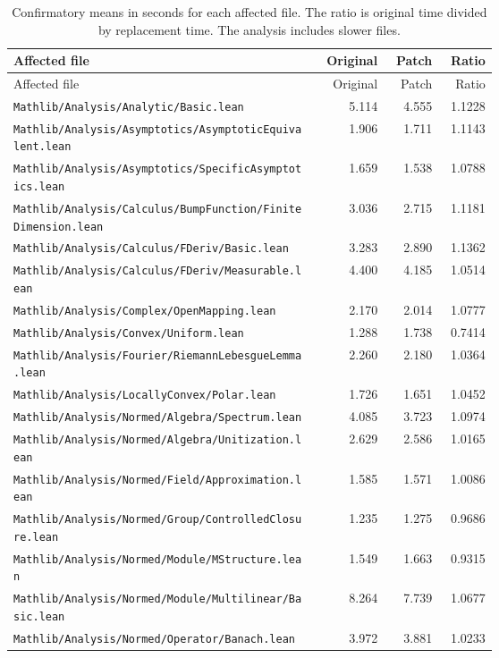 {\small
\begin{longtable}{p{0.63\linewidth}rrr}
\caption{Confirmatory means in seconds for each affected file. The ratio is original time divided by replacement time. The analysis includes slower files.}\\\toprule
Affected file & Original & Patch & Ratio\\\midrule
\endfirsthead
Affected file & Original & Patch & Ratio\\\midrule\endhead
\nolinkurl{Mathlib/Analysis/Analytic/Basic.lean} & 5.114 & 4.555 & 1.1228\\
\nolinkurl{Mathlib/Analysis/Asymptotics/AsymptoticEquivalent.lean} & 1.906 & 1.711 & 1.1143\\
\nolinkurl{Mathlib/Analysis/Asymptotics/SpecificAsymptotics.lean} & 1.659 & 1.538 & 1.0788\\
\nolinkurl{Mathlib/Analysis/Calculus/BumpFunction/FiniteDimension.lean} & 3.036 & 2.715 & 1.1181\\
\nolinkurl{Mathlib/Analysis/Calculus/FDeriv/Basic.lean} & 3.283 & 2.890 & 1.1362\\
\nolinkurl{Mathlib/Analysis/Calculus/FDeriv/Measurable.lean} & 4.400 & 4.185 & 1.0514\\
\nolinkurl{Mathlib/Analysis/Complex/OpenMapping.lean} & 2.170 & 2.014 & 1.0777\\
\nolinkurl{Mathlib/Analysis/Convex/Uniform.lean} & 1.288 & 1.738 & 0.7414\\
\nolinkurl{Mathlib/Analysis/Fourier/RiemannLebesgueLemma.lean} & 2.260 & 2.180 & 1.0364\\
\nolinkurl{Mathlib/Analysis/LocallyConvex/Polar.lean} & 1.726 & 1.651 & 1.0452\\
\nolinkurl{Mathlib/Analysis/Normed/Algebra/Spectrum.lean} & 4.085 & 3.723 & 1.0974\\
\nolinkurl{Mathlib/Analysis/Normed/Algebra/Unitization.lean} & 2.629 & 2.586 & 1.0165\\
\nolinkurl{Mathlib/Analysis/Normed/Field/Approximation.lean} & 1.585 & 1.571 & 1.0086\\
\nolinkurl{Mathlib/Analysis/Normed/Group/ControlledClosure.lean} & 1.235 & 1.275 & 0.9686\\
\nolinkurl{Mathlib/Analysis/Normed/Module/MStructure.lean} & 1.549 & 1.663 & 0.9315\\
\nolinkurl{Mathlib/Analysis/Normed/Module/Multilinear/Basic.lean} & 8.264 & 7.739 & 1.0677\\
\nolinkurl{Mathlib/Analysis/Normed/Operator/Banach.lean} & 3.972 & 3.881 & 1.0233\\

\end{longtable}}
